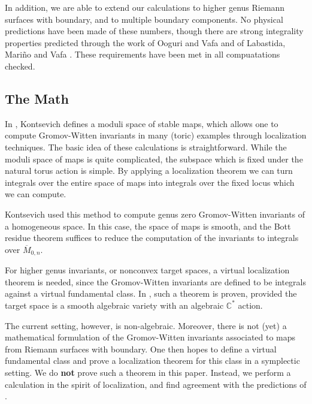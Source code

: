 \documentclass[a4paper,11pt]{article}
\newcommand{\C}{\mathbb{C}}
\newcommand{\M}{\overline{M}}
\begin{document}
In addition, we are able to extend our calculations to higher
genus Riemann surfaces with boundary, and to multiple
boundary components.  No physical predictions
have been made of these numbers, though there are
strong integrality properties predicted through the
work of Ooguri and Vafa \cite{OV}
and of Labastida, Mari\~no and Vafa \cite{LMV}.  These
requirements have been met in all compuatations checked.

\subsection{The Math}

In \cite{Kont},
Kontsevich defines a moduli space of stable maps,
which allows one to compute Gromov-Witten invariants
in many (toric) examples through
localization techniques.  The basic idea
of these calculations is straightforward.  While the
moduli space of maps is quite complicated, the
subspace which is fixed under the natural
torus action is simple.  By applying a localization
theorem we can turn integrals over the entire
space of maps into integrals over the fixed
locus which we can compute.

Kontsevich used this method to 
compute genus zero Gromov-Witten
invariants of a homogeneous space.  In this
case, the space of maps is smooth, and the
Bott residue theorem suffices to reduce the
computation of the invariants to integrals over
$\M_{0,n}$.

For higher genus invariants, or nonconvex target
spaces, a virtual localization theorem is needed,
since the Gromov-Witten invariants 
are defined to be integrals against a
virtual fundamental class.
In \cite{GP}, such a theorem is proven, provided
the target space is a smooth algebraic variety with
an algebraic $\C^*$ action.

The current setting, however, is non-algebraic.
Moreover, there is not (yet) a mathematical formulation
of the Gromov-Witten invariants associated to maps
from Riemann surfaces with boundary.
One then hopes to define a virtual fundamental
class and prove a localization theorem for
this class in 
a symplectic setting.
We do {\bf not} prove such a theorem in this paper.
Instead, we perform a calculation in the spirit of
localization, and find agreement with the
predictions of \cite{AKV}.
\end{document}
